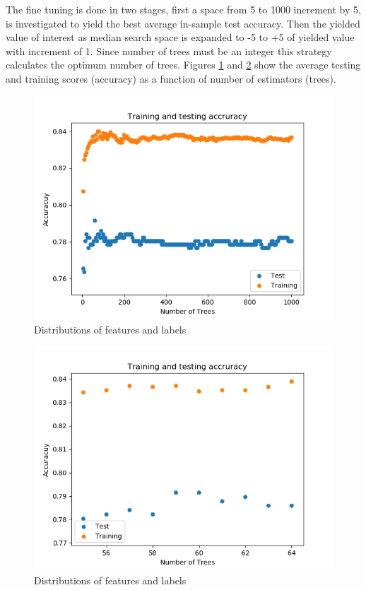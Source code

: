 \documentclass[11pt]{article}
\begin{document}
The fine tuning is done in two stages, first a space from 5 to 1000 increment by 5, is investigated to yield the best average in-sample test accuracy. Then the yielded value of interest as median search space is expanded to -5 to +5 of yielded value with increment of 1. Since number of trees must be an integer this strategy calculates the optimum number of trees. Figures \ref{fig:q2_rf1} and \ref{fig:q2_rf2} show the average testing and training scores (accuracy) as a function of number of estimators (trees).
\begin{multicols}{2} 

\begin{figure}[H]
\centering
\includegraphics[width=0.98\columnwidth]{pics/q2_rf1.png}
\captionsetup{justification=centering}
\caption{Distributions of features and labels}
\label{fig:q2_rf1}
\end{figure}

\begin{figure}[H]
\centering
\includegraphics[width=0.98\columnwidth]{pics/q2_rf2.png}
\captionsetup{justification=centering}
\caption{Distributions of features and labels}
\label{fig:q2_rf2}
\end{figure}

\end{multicols}
\end{document}
